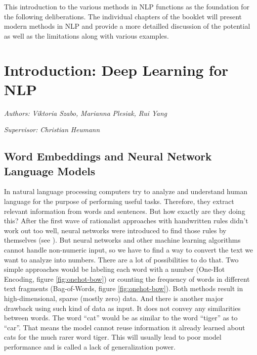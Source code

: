 \documentclass[]{krantz}
\begin{document}
This introduction to the various methods in NLP functions as the foundation for the following deliberations. The individual chapters of the booklet will present modern methods in NLP and provide a more detailled discussion of the potential as well as the limitations along with various examples.

\hypertarget{introduction-deep-learning-for-nlp}{%
\chapter{Introduction: Deep Learning for NLP}\label{introduction-deep-learning-for-nlp}}

\emph{Authors: Viktoria Szabo, Marianna Plesiak, Rui Yang}

\emph{Supervisor: Christian Heumann}

\hypertarget{word-embeddings-and-neural-network-language-models}{%
\section{Word Embeddings and Neural Network Language Models}\label{word-embeddings-and-neural-network-language-models}}

In natural language processing computers try to analyze and understand human language for the purpose of performing useful tasks. Therefore, they extract relevant information from words and sentences. But how exactly are they doing this? After the first wave of rationalist approaches with handwritten rules didn't work out too well, neural networks were introduced to find those rules by themselves (see \citet{Bengio.2003}). But neural networks and other machine learning algorithms cannot handle non-numeric input, so we have to find a way to convert the text we want to analyze into numbers.
There are a lot of possibilities to do that. Two simple approaches would be labeling each word with a number (One-Hot Encoding, figure \ref{fig:onehot-bow}) or counting the frequency of words in different text fragments (Bag-of-Words, figure \ref{fig:onehot-bow}). Both methods result in high-dimensional, sparse (mostly zero) data. And there is another major drawback using such kind of data as input. It does not convey any similarities between words. The word ``cat'' would be as similar to the word ``tiger'' as to ``car''. That means the model cannot reuse information it already learned about cats for the much rarer word tiger. This will usually lead to poor model performance and is called a lack of generalization power.
\end{document}

